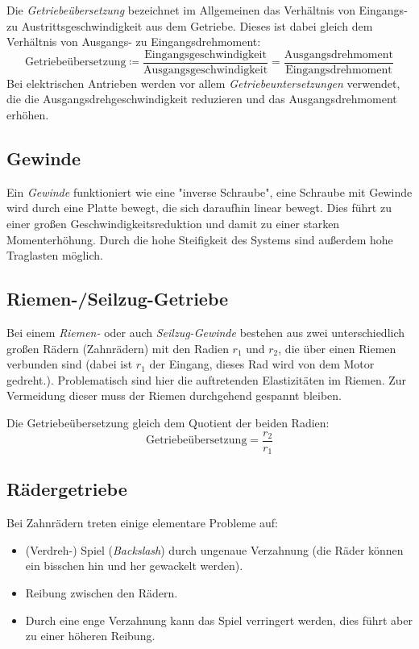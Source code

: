 		Die \emph{Getriebeübersetzung} bezeichnet im Allgemeinen das Verhältnis von Eingangs- zu Austrittsgeschwindigkeit aus dem Getriebe. Dieses ist dabei gleich dem Verhältnis von Ausgangs- zu Eingangsdrehmoment:
		\begin{equation*}
			\text{Getriebeübersetzung} \coloneqq \frac{\text{Eingangsgeschwindigkeit}}{\text{Ausgangsgeschwindigkeit}} = \frac{\text{Ausgangsdrehmoment}}{\text{Eingangsdrehmoment}}
		\end{equation*}
		Bei elektrischen Antrieben werden vor allem \emph{Getriebeuntersetzungen} verwendet, die die Ausgangsdrehgeschwindigkeit reduzieren und das Ausgangsdrehmoment erhöhen.

		\subsection{Gewinde}
			Ein \emph{Gewinde} funktioniert wie eine "inverse Schraube", \dh eine Schraube mit Gewinde wird durch eine Platte bewegt, die sich daraufhin linear bewegt. Dies führt zu einer großen Geschwindigkeitsreduktion und damit zu einer starken Momenterhöhung. Durch die hohe Steifigkeit des Systems sind außerdem hohe Traglasten möglich.

		\subsection{Riemen-/Seilzug-Getriebe}
			Bei einem \emph{Riemen-} oder auch \emph{Seilzug-Gewinde} bestehen aus zwei unterschiedlich großen Rädern (\zB Zahnrädern) mit den Radien \(r_1\) und \(r_2\), die über einen Riemen verbunden sind (dabei ist \(r_1\) der Eingang, \dh dieses Rad wird von dem Motor gedreht.). Problematisch sind hier die auftretenden Elastizitäten im Riemen. Zur Vermeidung dieser muss der Riemen durchgehend gespannt bleiben.
			
			Die Getriebeübersetzung gleich dem Quotient der beiden Radien:
			\begin{equation*}
				\text{Getriebeübersetzung} = \frac{r_2}{r_1}
			\end{equation*}

		\subsection{Rädergetriebe}
			Bei Zahnrädern treten einige elementare Probleme auf:
			\begin{itemize}
				\item (Verdreh-) Spiel (\emph{Backslash}) durch ungenaue Verzahnung (\dh die Räder können ein bisschen hin und her gewackelt werden).
				\item Reibung zwischen den Rädern.
				\item Durch eine enge Verzahnung kann das Spiel verringert werden, dies führt aber zu einer höheren Reibung.
			\end{itemize}
		
